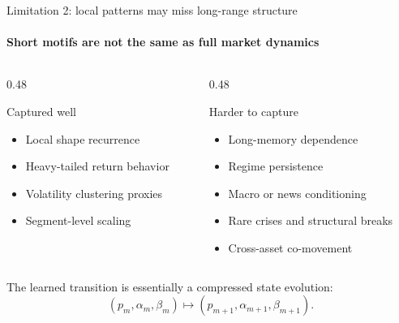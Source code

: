 \begin{frame}{Limitation 2: local patterns may miss long-range structure}
\framesubtitle{Short motifs are not the same as full market dynamics}

\begin{columns}[onlytextwidth]
\begin{column}{0.48\textwidth}
\begin{block}{Captured well}
\begin{itemize}
\item Local shape recurrence
\item Heavy-tailed return behavior
\item Volatility clustering proxies
\item Segment-level scaling
\end{itemize}
\end{block}
\end{column}

\begin{column}{0.48\textwidth}
\begin{block}{Harder to capture}
\begin{itemize}
\item Long-memory dependence
\item Regime persistence
\item Macro or news conditioning
\item Rare crises and structural breaks
\item Cross-asset co-movement
\end{itemize}
\end{block}
\end{column}
\end{columns}

\medskip

The learned transition is essentially a compressed state evolution:
\[
(p_m,\alpha_m,\beta_m)
\mapsto
(p_{m+1},\alpha_{m+1},\beta_{m+1}).
\]

\end{frame}


